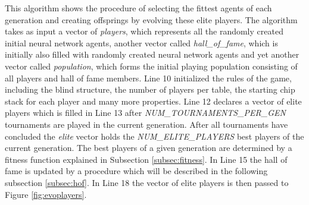 This algorithm shows the procedure of selecting the fittest agents of each generation and creating offsprings by evolving these elite players. The algorithm takes as input a vector of \textit{players}, which represents all the randomly created initial neural network agents, another vector called \textit{hall\_of\_fame}, which is initially also filled with randomly created neural network agents and yet another vector called \textit{population}, which forms the initial playing population consisting of all players and hall of fame members. Line 10 initialized the rules of the game, including the blind structure, the number of players per table, the starting chip stack for each player and many more properties. Line 12 declares a vector of elite players which is filled in Line 13 after \textit{NUM\_TOURNAMENTS\_PER\_GEN} tournaments are played in the current generation. After all tournaments have concluded the \textit{elite} vector holds the \textit{NUM\_ELITE\_PLAYERS} best players of the current generation. The best players of a given generation are determined by a fitness function explained in Subsection \ref{subsec:fitness}. In Line 15 the hall of fame is updated by a procedure which will be described in the following subsection \ref{subsec:hof}. In Line 18 the vector of elite players is then passed to Figure \ref{fig:evoplayers}.\par
